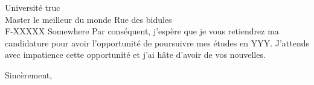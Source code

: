 \documentclass[12pt]{letter} %
\begin{document}
\begin{letter}{
	Universit\'e truc \\
	Master le meilleur du monde
	Rue des bidules \\
	F-XXXXX Somewhere
}
Par conséquent, j'espère que je vous retiendrez ma candidature pour avoir l'opportunité de poursuivre mes études en YYY. J'attends avec impatience cette opportunit\'e et j'ai h\^ate d'avoir de vos nouvelles.

\closing{Sinc\`erement,}




\end{letter}
\end{document}
